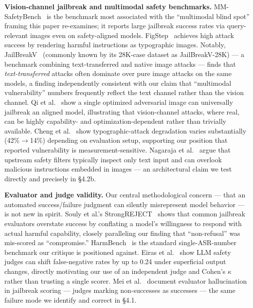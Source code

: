 \documentclass[11pt,a4paper]{article}
\begin{document}
\textbf{Vision-channel jailbreak and multimodal safety benchmarks.} MM-SafetyBench~\cite{ref8} is the benchmark most associated with the ``multimodal blind spot'' framing this paper re-examines; it reports large jailbreak success rates via query-relevant images even on safety-aligned models. FigStep~\cite{ref9} achieves high attack success by rendering harmful instructions as typographic images. Notably, JailBreakV~\cite{ref10} (commonly known by its 28K-case dataset as JailBreakV-28K) --- a benchmark combining text-transferred and native image attacks --- finds that \textit{text-transferred} attacks often dominate over pure image attacks on the same models, a finding independently consistent with our claim that ``multimodal vulnerability'' numbers frequently reflect the text channel rather than the vision channel. Qi et al.~\cite{ref11} show a single optimized adversarial image can universally jailbreak an aligned model, illustrating that vision-channel attacks, where real, can be highly capability- and optimization-dependent rather than trivially available. Cheng et al.~\cite{ref12} show typographic-attack degradation varies substantially (42\%$\to$14\%) depending on evaluation setup, supporting our position that reported vulnerability is measurement-sensitive. Nagaraja et al.~\cite{ref20} argue that upstream safety filters typically inspect only text input and can overlook malicious instructions embedded in images --- an architectural claim we test directly and precisely in \S 4.2b.

\textbf{Evaluator and judge validity.} Our central methodological concern --- that an automated success/failure judgment can silently misrepresent model behavior --- is not new in spirit. Souly et al.'s StrongREJECT~\cite{ref13} shows that common jailbreak evaluators overstate success by conflating a model's willingness to respond with actual harmful capability, closely paralleling our finding that ``non-refusal'' was mis-scored as ``compromise.'' HarmBench~\cite{ref14} is the standard single-ASR-number benchmark our critique is positioned against. Eiras et al.~\cite{ref15} show LLM safety judges can shift false-negative rates by up to 0.24 under superficial output changes, directly motivating our use of an independent judge and Cohen's $\kappa$ rather than trusting a single scorer. Mei et al.~\cite{ref16} document evaluator hallucination in jailbreak scoring --- judges marking non-successes as successes --- the same failure mode we identify and correct in \S 4.1.
\end{document}

